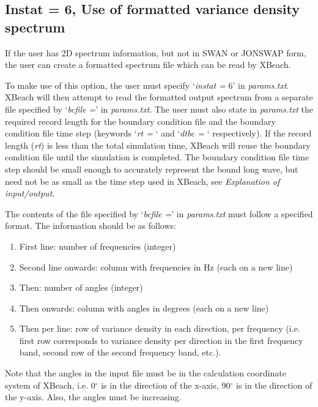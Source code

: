 \subsection{ Instat = 6, Use of formatted variance density spectrum}

If the user has 2D spectrum information, but not in SWAN or JONSWAP form, the user can create a formatted spectrum file which can be read by XBeach. 

To make use of this option, the user must specify `\textit{instat =} 6' in \textit{params.txt}. XBeach will then attempt to read the formatted output spectrum from a separate file specified by `\textit{bcfile =}' in \textit{params.txt}. The user must also state in \textit{params.txt} the required record length for the boundary condition file and the boundary condition file time step (keywords `\textit{rt =} ` and `\textit{dtbc =} ` respectively). If the record length (\textit{rt}) is less than the total simulation time, XBeach will reuse the boundary condition file until the simulation is completed. The boundary condition file time step should be small enough to accurately represent the bound long wave, but need not be as small as the time step used in XBeach, see \textit{Explanation of input/output.}

The contents of the file specified by `\textit{bcfile =}' in \textit{params.txt} must follow a specified format. The information should be as follows:

\begin{enumerate}
\item  First line: number of frequencies (integer)

\item  Second line onwards: column with frequencies in Hz (each on a new line)

\item  Then: number of angles (integer)

\item  Then onwards: column with angles in degrees (each on a new line)

\item  Then per line: row of variance density in each direction, per frequency (i.e. first row corresponds to variance density per direction in the first frequency band, second row of the second frequency band, etc.).
\end{enumerate}

Note that the angles in the input file must be in the calculation coordinate system of XBeach, i.e. 0${}^\circ$ is in the direction of the x-axis, 90${}^\circ$ is in the direction of the y-axis. Also, the angles must be increasing.

